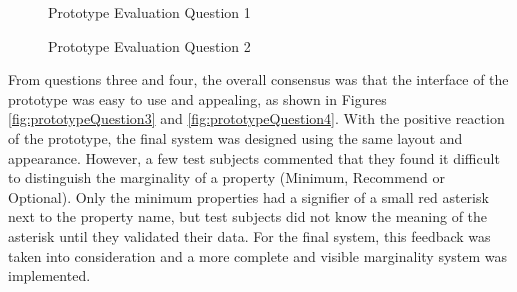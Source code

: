 \begin{figure}[!h]
  \centering
  \begin{minipage}[b]{0.47\textwidth}
\caption{Prototype Evaluation Question 1}
\label{fig:prototypeQuestion1}
  \end{minipage}
  \hfill
  \begin{minipage}[b]{0.47\textwidth}
\caption{Prototype Evaluation Question 2}
\label{fig:prototypeQuestion2}
  \end{minipage}
\end{figure}

From questions three and four, the overall consensus was that the interface of the prototype was easy to use and appealing, as shown in Figures \ref{fig:prototypeQuestion3} and \ref{fig:prototypeQuestion4}. With the positive reaction of the prototype, the final system was designed using the same layout and appearance. However, a few test subjects commented that they found it difficult to distinguish the marginality of a property (Minimum, Recommend or Optional). Only the minimum properties had a signifier of a small red asterisk next to the property name, but test subjects did not know the meaning of the asterisk until they validated their data. For the final system, this feedback was taken into consideration and a more complete and visible marginality system was implemented. \newline 

